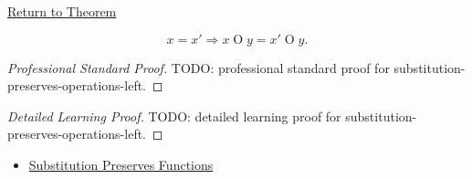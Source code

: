 \newpage
{}
\label{prf:substitution-preserves-operations-left}

\begin{remark*}[Return]
\hyperref[prop:substitution-preserves-operations-left]{Return to Theorem}
\end{remark*}

\begin{proposition*}
\[
x=x' \Longrightarrow x\mathbin{O}y=x'\mathbin{O}y.
\]
\end{proposition*}

\begin{proof}[Professional Standard Proof]
\LRAProofBodyStart
TODO: professional standard proof for substitution-preserves-operations-left.
\end{proof}

\begin{proof}[Detailed Learning Proof]
\LRAProofBodyStart
TODO: detailed learning proof for substitution-preserves-operations-left.
\end{proof}

\begin{remark*}
\end{remark*}

\begin{dependencies}
\begin{itemize}
  \item \hyperref[prop:substitution-preserves-functions]{Substitution Preserves Functions}
\end{itemize}
\end{dependencies}

\clearpage
